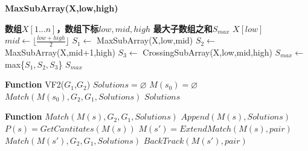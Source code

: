 \documentclass{article}
\begin{document}
\begin{CJK}{UTF8}{gbsn}
    \begin{algorithm}
            \caption{\textbf{MaxSubArray(X,low,high)}}
            \begin{algorithmic}[1]
                \Require \textbf{数组$X[1...n]$，数组下标$low,mid,high$}
                \Ensure \textbf{最大子数组之和$S_{max}$}
                    \State \Return $X[low]$
                \Else
                    \State $mid \leftarrow \lfloor \frac{low+high}{2} \rfloor$
                    \State $S_1 \leftarrow $ MaxSubArray(X,low,mid)
                    \State $S_2 \leftarrow $ MaxSubArray(X,mid+1,high)
                    \State $S_3 \leftarrow $ CrossingSubArray(X,low,mid,high)
                    \State $S_{max} \leftarrow $ max\{$S_1,S_2,S_3$\}
                    \State \Return $S_{max}$
                \EndIf
        \end{algorithmic}
    \end{algorithm}

    \begin{algorithm}
            \begin{algorithmic}[1]
            \State \textbf{Function}  VF2($G_1$,$G_2$)
                \State $Solutions=\varnothing$
                \State $M(s_0)=\varnothing$
                \State $Match(M(s_0),G_2,G_1,Solutions)$
                \State \Return $Solutions$
        \end{algorithmic}
    \end{algorithm}

    \begin{algorithm}
            \begin{algorithmic}[1]
            \State \textbf{Function} $Match(M(s),G_2,G_1,Solutions)$
                    \State $Append(M(s),Solutions)$
                \Else
                    \State $P(s)=GetCantitates(M(s))$
                            \State $M(s')=ExtendMatch(M(s),pair)$
                            \State $Match(M(s'),G_2,G_1,Solutions)$
                            \State $BackTrack(M(s'),pair)$
                        \EndIf
                    \EndFor
                \EndIf
        \end{algorithmic}
    \end{algorithm}



    \end{CJK}
\end{document}
